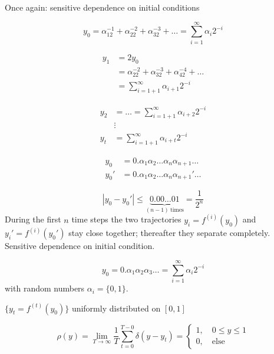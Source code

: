 \begin{framed}
Once again: sensitive dependence on initial conditions

\begin{equation}
y_0 = \alpha_12^{-1} + \alpha_22^{-2} + \alpha_32^{-3} + \dots = \sum_{i=1}^\infty\alpha_i2^{-i}
\end{equation}

\begin{align}
y_1 &= 2y_0 \\
&= \alpha_22^{-2} + \alpha_32^{-3} + \alpha_42^{-4}+\dots\\
&= \sum_{i=1+1}^\infty\alpha_{i+1}2^{-i}
\end{align}

\begin{align}
y_2 &= \dots = \sum_{i=1+1}^\infty\alpha_{i+2}2^{-i}\\
&\vdots\\
y_t &= \sum_{i=1+1}^\infty\alpha_{i+t}2^{-i}
\end{align}

\begin{align}
y_0 &= 0.\alpha_1\alpha_2\dots\alpha_n\alpha_{n+1}\dots\\
y_0' &= 0.\alpha_1\alpha_2\dots\alpha_n\alpha_{n+1}'\dots 
\end{align}

\begin{equation}
|y_0-y_0'|\leq \underbrace{0.00\dots01}_{(n-1)\ \mathrm{times}} = \frac{1}{2^n}
\end{equation}
During the first $n$ time steps the two trajectories $y_i=f^{(i)}(y_0)$ and $y_i'=f^{(i)}(y_0')$ stay close together; thereafter they separate completely. Sensitive dependence on initial condition.
\end{framed}

\begin{equation}
y_0=0.\alpha_1\alpha_2\alpha_3\dots=\sum_{i=1}^\infty\alpha_i2^{-i}
\end{equation}
with random numbers $\alpha_i=\{0,1\}$.

$\{y_t=f^{(t)}(y_0)\}$ uniformly distributed on $[0,1]$

\begin{equation}
\rho(y) = \lim_{T\rightarrow\infty}\frac{1}{T}\sum_{t=0}^{T-0}\delta(y-y_t) = \begin{cases}
1,\quad 0\leq y \leq 1 \\ 0, \quad \mathrm{else} \end{cases}
\end{equation}

